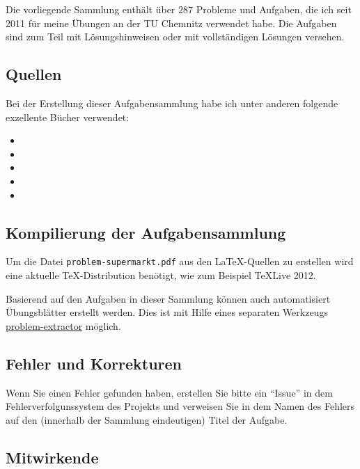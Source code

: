 
Die vorliegende Sammlung enthält über $287$ Probleme und Aufgaben, die ich seit
2011 für meine Übungen an der TU Chemnitz verwendet habe. Die Aufgaben sind zum
Teil mit Lösungshinweisen oder mit vollständigen Lösungen versehen. 

\subsection*{Quellen}

Bei der Erstellung dieser Aufgabensammlung habe ich unter anderen folgende
exzellente Bücher verwendet:

\begin{itemize}
    \item {}
    \item {}
    \item {}
    \item {}
    \item {}
\end{itemize}

\subsection*{Kompilierung der Aufgabensammlung} 

Um die Datei \texttt{problem-supermarkt.pdf} aus den \LaTeX{}-Quellen zu erstellen
wird eine aktuelle \TeX{}-Distribution benötigt, wie zum Beispiel \TeX{}Live 2012. 

Basierend auf den Aufgaben in dieser Sammlung können auch automatisiert 
Übungsblätter erstellt werden. Dies ist mit Hilfe eines separaten Werkzeugs 
\href{https://github.com/jwergieluk/problem-extractor}{problem-extractor}
möglich. 

\subsection*{Fehler und Korrekturen}

Wenn Sie einen Fehler gefunden haben, erstellen Sie bitte ein ``Issue'' in dem
Fehlerverfolgunssystem des Projekts und verweisen Sie in dem Namen des Fehlers
auf den (innerhalb der Sammlung eindeutigen) Titel der Aufgabe. 

\subsection*{Mitwirkende}

